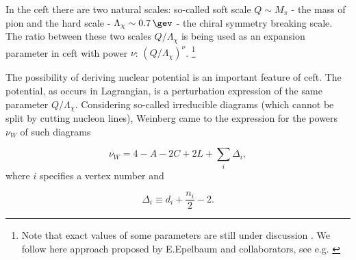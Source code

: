  
In the \gls{ceft} there are two natural scales: so-called soft scale $Q \sim M_\pi$  -
the mass of pion and the hard scale -
$\Lambda_\chi \sim \SI{0.7}{\gev}$ - the chiral symmetry breaking scale.
The ratio between these two scales $Q/\Lambda_\chi$
is being used as an expansion parameter in  \gls{ceft} with power
$\nu$: $\left(Q/\Lambda_\chi\right)^\nu$.
\footnote{Note that exact values of some parameters are still under discussion \cite{Epelbaum2004}. We follow here approach proposed by E.Epelbaum and collaborators, see e.g. \cite{reinkrebs2018}}

The possibility of deriving nuclear potential is an important feature of \gls{ceft}.
The potential, as occurs in Lagrangian, is a perturbation expression of the same parameter $Q/\Lambda_\chi$.
Considering so-called irreducible diagrams (which cannot be split
by cutting nucleon lines), Weinberg \cite{WEINBERG1990,WEINBERG1991}
came to the expression for the powers $\nu_W$ of such diagrams

\begin{equation}
    \nu_W = 4 - A - 2C + 2L + \sum_i \Delta_i,
    \label{powers}
\end{equation}
where $i$ specifies a vertex number and

\begin{equation}
    \Delta_i \equiv d_i + \frac{n_i}{2} - 2.
    \label{Delta}
\end{equation}

